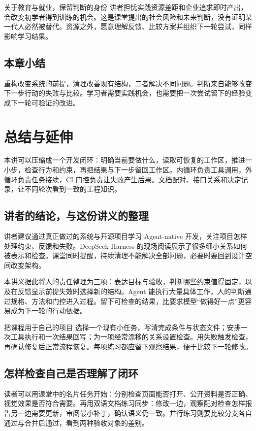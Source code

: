 \documentclass[a4paper]{article}
\begin{document}
\begin{warningbox}{关于教育与就业，保留判断的身份}
讲者担忧实践资源差距和企业追求即时产出，会改变初学者得到训练的机会。这是课堂提出的社会风险和未来判断，没有证明某一代人必然被替代。资源之外，愿意理解反馈、比较方案并组织下一轮尝试，同样影响学习结果。
\end{warningbox}

\subsection{本章小结}
重构改变系统的前提，清理改善现有结构，二者解决不同问题。判断来自能够改变下一步行动的失败与比较。学习者需要实践机会，也需要把一次尝试留下的经验变成下一轮可验证的改进。

\section{总结与延伸}
\label{sec:synthesis}
本讲可以压缩成一个开发闭环：明确当前要做什么，读取可恢复的工作区，推进一小步，检查行为和约束，再把结果与下一步留回工作区。内循环负责工具调用，外循环负责任务接续，CI 门控负责让失败产生后果。文档配对、接口关系和决定记录，让不同轮次看到一致的工程知识。

\subsection{讲者的结论，与这份讲义的整理}
讲者建议通过真正做过的系统与开源项目学习 Agent-native 开发，关注项目怎样处理约束、反馈和失败。DeepSeek Harness 的现场阅读展示了很多细小关系如何被表示和检查。课堂同时提醒，持续清理不能解决全部问题，必要时要回到设计空间改变架构。

本讲义据此将人的责任整理为三项：表达目标与验收，判断哪些约束值得固定，以及在反馈显示前提失效时选择新的结构。Agent 能执行大量具体工作，人的判断通过规格、方法和门控进入过程。留下可检查的结果，比要求模型“做得好一点”更容易成为下一轮的行动依据。

\begin{importantbox}{把课程用于自己的项目}
选择一个现有小任务，写清完成条件与状态文件；安排一次工具执行和一次结果回写；为一项经常漂移的关系设置检查。用失败触发检查，再确认修复后正常流程恢复。每项练习都应留下观察结果，便于比较下一轮修改。
\end{importantbox}

\subsection{怎样检查自己是否理解了闭环}
读者可以用课堂中的名片任务开始：分别检查页面能否打开、公开资料是否正确、视觉效果是否符合需要。再用双语文档练习同步：修改一边，观察配对检查怎样报告另一边需要更新，审阅最小补丁，确认语义仍一致。并行练习则要比较分支各自通过与合并后通过，看到两种验收对象的差别。
\end{document}
